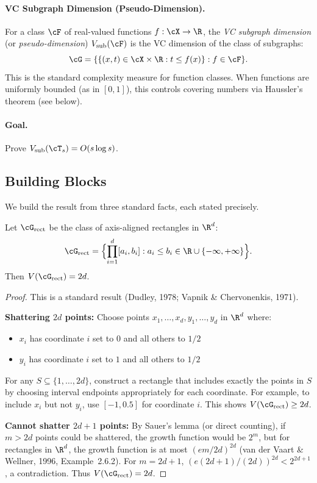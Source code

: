 \paragraph{VC Subgraph Dimension (Pseudo-Dimension).}
For a class $\cF$ of real-valued functions $f: \cX \to \R$, the \emph{VC subgraph dimension} (or \emph{pseudo-dimension}) $V_{\text{sub}}(\cF)$ is the VC dimension of the class of subgraphs:
\[
\cG = \{ \{ (x,t) \in \cX \times \R : t \le f(x) \} : f \in \cF \}.
\]
This is the standard complexity measure for function classes. When functions are uniformly bounded (as in $[0,1]$), this controls covering numbers via Haussler's theorem (see below).

\paragraph{Goal.}
Prove $V_{\text{sub}}(\cT_s) = O(s \log s)$.

\subsection{Building Blocks}

We build the result from three standard facts, each stated precisely.

\begin{lemma}
\label{lem:vc-rect-app}
Let $\cG_{\text{rect}}$ be the class of axis-aligned rectangles in $\R^d$:
\[
\cG_{\text{rect}} = \Bigl\{ \prod_{i=1}^d [a_i, b_i] : a_i \le b_i \in \R \cup \{-\infty, +\infty\} \Bigr\}.
\]
Then $V(\cG_{\text{rect}}) = 2d$.
\end{lemma}

\begin{proof}
This is a standard result (Dudley, 1978; Vapnik \& Chervonenkis, 1971).

\textbf{Shattering $2d$ points:} Choose points $x_1, \ldots, x_d, y_1, \ldots, y_d$ in $\R^d$ where:
\begin{itemize}
\item $x_i$ has coordinate $i$ set to $0$ and all others to $1/2$
\item $y_i$ has coordinate $i$ set to $1$ and all others to $1/2$
\end{itemize}
For any $S \subseteq \{1,\ldots,2d\}$, construct a rectangle that includes exactly the points in $S$ by choosing interval endpoints appropriately for each coordinate. For example, to include $x_i$ but not $y_i$, use $[-1, 0.5]$ for coordinate $i$. This shows $V(\cG_{\text{rect}}) \ge 2d$.

\textbf{Cannot shatter $2d+1$ points:} By Sauer's lemma (or direct counting), if $m > 2d$ points could be shattered, the growth function would be $2^m$, but for rectangles in $\R^d$, the growth function is at most $(em/2d)^{2d}$ (van der Vaart \& Wellner, 1996, Example~2.6.2). For $m = 2d+1$, $(e(2d+1)/(2d))^{2d} < 2^{2d+1}$, a contradiction. Thus $V(\cG_{\text{rect}}) = 2d$.
\end{proof}

